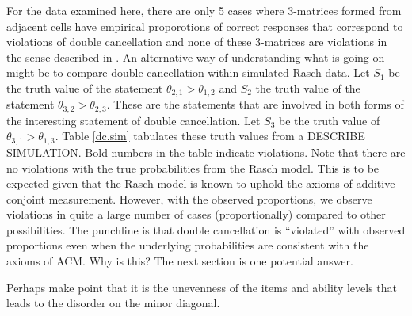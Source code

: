 \documentclass[12pt]{article}
\begin{document}
For the data examined here, there are only 5 cases where 3-matrices formed from adjacent cells have empirical proporotions of correct responses that correspond to violations of double cancellation and none of these 3-matrices are violations in the sense described in . An alternative way of understanding what is going on might be to compare double cancellation within simulated Rasch data. Let $S_1$ be the truth value of the statement $\theta_{2,1}>\theta_{1,2}$ and $S_2$ the truth value of the statement $\theta_{3,2}>\theta_{2,3}$. These are the statements that are involved in both forms of the interesting statement of double cancellation. Let $S_3$ be the truth value of $\theta_{3,1}>\theta_{1,3}$. Table \ref{dc.sim} tabulates these truth values from a DESCRIBE SIMULATION. Bold numbers in the table indicate violations. Note that there are no violations with the true probabilities from the Rasch model. This is to be expected given that the Rasch model is known to uphold the axioms of additive conjoint measurement. However, with the observed proportions, we observe violations in quite a large number of cases (proportionally) compared to other possibilities. The punchline is that double cancellation is ``violated'' with observed proportions even when the underlying probabilities are consistent with the axioms of ACM. Why is this? The next section is one potential answer.





Perhaps make point that it is the unevenness of the items and ability levels that leads to the disorder on the minor diagonal.
\end{document}
